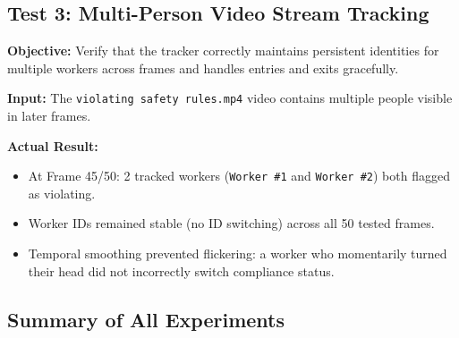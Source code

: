 \documentclass[12pt,a4paper]{report}
\begin{document}
\vspace{0.5cm}
\begin{center}
\end{center}

\subsection{Test 3: Multi-Person Video Stream Tracking}

\textbf{Objective:} Verify that the tracker correctly maintains persistent identities for multiple workers across frames and handles entries and exits gracefully.

\textbf{Input:} The \texttt{violating safety rules.mp4} video contains multiple people visible in later frames.

\textbf{Actual Result:}
\begin{itemize}
    \item At Frame 45/50: 2 tracked workers (\texttt{Worker \#1} and \texttt{Worker \#2}) both flagged as violating.
    \item Worker IDs remained stable (no ID switching) across all 50 tested frames.
    \item Temporal smoothing prevented flickering: a worker who momentarily turned their head did not incorrectly switch compliance status.
\end{itemize}

\vspace{0.5cm}
\begin{center}
\end{center}

\subsection{Summary of All Experiments}
\end{document}
